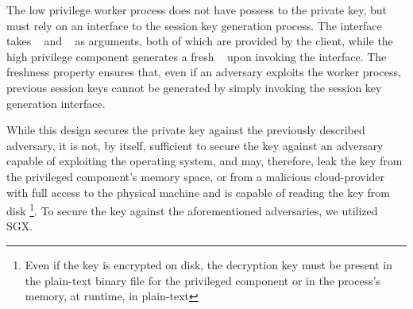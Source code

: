 \documentclass[../main.tex]{subfiles}
\begin{document}
The low privilege worker process does not have possess to the private key, but
must rely on an interface to the session key generation process. The interface
takes \crandom~ and \premaster~ as arguments, both of which are provided by the
client, while the high privilege component generates a fresh \srandom~ upon
invoking the interface. The freshness property ensures that, even if an
adversary exploits the worker process, previous session keys cannot be generated
by simply invoking the session key generation interface. 

While this design secures the private key against the previously described
adversary, it is not, by itself, sufficient to secure the key against an
adversary capable of exploiting the operating system, and may, therefore,
leak the key from the privileged component's memory space, or from a malicious
cloud-provider with full access to the physical machine and is capable of
reading the key from disk \footnote{Even if the key is encrypted on disk, the
decryption key must be present in the plain-text binary file for the privileged
component or in the process's memory, at runtime, in plain-text}. To secure the
key against the aforementioned adversaries, we utilized SGX. 
\end{document}
